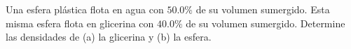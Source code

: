 \item Una esfera plástica flota en agua con $50.0\%$ de su volumen sumergido. Esta misma esfera flota en glicerina con $40.0\%$ de su volumen sumergido. Determine las densidades de (a) la glicerina y (b) la esfera.
